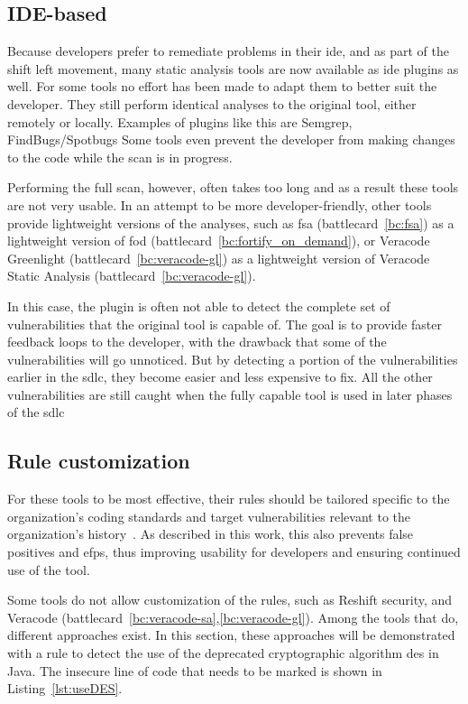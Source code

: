\subsection{IDE-based}
Because developers prefer to remediate problems in their \gls{ide}, and as part of the shift left movement, many static analysis tools are now available as \gls{ide} plugins as well.
For some tools no effort has been made to adapt them to better suit the developer.
They still perform identical analyses to the original tool, either remotely or locally.
Examples of plugins like this are Semgrep, FindBugs/Spotbugs
Some tools even prevent the developer from making changes to the code while the scan is in progress.


Performing the full scan, however, often takes too long and as a result these tools are not very usable.
In an attempt to be more developer-friendly, other tools provide lightweight versions of the analyses, such as \gls{fsa} (battlecard~\ref{bc:fsa}) as a lightweight version of \gls{fod} (battlecard~\ref{bc:fortify_on_demand}), or Veracode Greenlight (battlecard~\ref{bc:veracode-gl}) as a lightweight version of Veracode Static Analysis (battlecard~\ref{bc:veracode-gl}).

In this case, the plugin is often not able to detect the complete set of vulnerabilities that the original tool is capable of.
The goal is to provide faster feedback loops to the developer, with the drawback that some of the vulnerabilities will go unnoticed.
But by detecting a portion of the vulnerabilities earlier in the \gls{sdlc}, they become easier and less expensive to fix.
All the other vulnerabilities are still caught when the fully capable tool is used in later phases of the \gls{sdlc}

\subsection{Rule customization}
\label{sec:customization}
For these tools to be most effective, their rules should be tailored specific to the organization's coding standards and target vulnerabilities relevant to the organization's history~\cite{bsimm9,bsimm11}.
As described in this work, this also prevents false positives and \glspl{efp}, thus improving usability for developers and ensuring continued use of the tool.

Some tools do not allow customization of the rules, such as Reshift security, and Veracode (battlecard~\ref{bc:veracode-sa},\ref{bc:veracode-gl}).
Among the tools that do, different approaches exist.
In this section, these approaches will be demonstrated with a rule to detect the use of the deprecated cryptographic algorithm \gls{des} in Java.
The insecure line of code that needs to be marked is shown in Listing~\ref{lst:useDES}.

